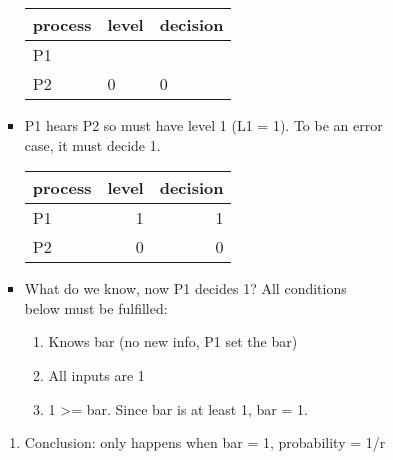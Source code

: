 \documentclass[11pt]{article}
\begin{document}
\begin{enumerate}
\begin{enumerate}
\begin{enumerate}
\begin{enumerate}
\begin{enumerate}
\begin{itemize}
\begin{center}
\begin{tabular}{lll}
                                                    process & level & decision\\
                                                    \hline
                                                    P1 &  & \\
                                                    P2 & 0 & 0\\
                                                  \end{tabular}
                                                \end{center}
                                          \item P1 hears P2 so must have level 1 (L1 = 1). To be an error case, it must
                                                decide 1.
                                                \begin{center}
                                                  \begin{tabular}{lrr}
                                                    process & level & decision\\
                                                    \hline
                                                    P1 & 1 & 1\\
                                                    P2 & 0 & 0\\
                                                  \end{tabular}
                                                \end{center}
                                          \item What do we know, now P1 decides 1? All conditions below must be fulfilled:
                                                \begin{enumerate}
                                                  \item Knows bar (no new info, P1 set the bar)
                                                  \item All inputs are 1
                                                  \item 1 >= bar. Since bar is at least 1, bar = 1.
                                                \end{enumerate}
                                        \end{itemize}
                                        \begin{enumerate}
                                          \item Conclusion: only happens when bar = 1, probability = 1/r

\end{enumerate}
\end{enumerate}
\end{enumerate}
\end{enumerate}
\end{enumerate}
\end{enumerate}
\end{document}
